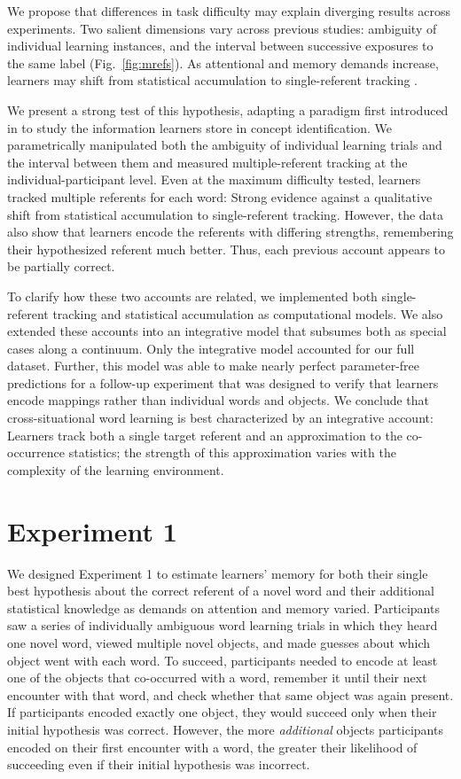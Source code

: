 \documentclass[man,floatsintext]{apa6}
\begin{document}
We propose that differences in task difficulty may explain diverging results across experiments. Two salient dimensions vary across previous studies: ambiguity of individual learning instances, and the interval between successive exposures to the same label (Fig.~\ref{fig:mrefs}). As attentional and memory demands increase, learners may shift from statistical accumulation to single-referent tracking \cite{Smith2011a, Trueswell2013}. 

We present a strong test of this hypothesis, adapting a paradigm first introduced in  to study the information learners store in concept identification. We parametrically manipulated both the ambiguity of individual learning trials and the interval between them and measured multiple-referent tracking at the individual-participant level. Even at the maximum difficulty tested, learners tracked multiple referents for each word: Strong evidence against a qualitative shift from statistical accumulation to single-referent tracking. However, the data also show that learners encode the referents with differing strengths, remembering their hypothesized referent much better. Thus, each previous account appears to be partially correct. 

To clarify how these two accounts are related, we implemented both single-referent tracking and statistical accumulation as computational models. We also extended these accounts into an integrative model that subsumes both as special cases along a continuum. Only the integrative model accounted for our full dataset. Further, this model was able to make nearly perfect parameter-free predictions for a follow-up experiment that was designed to verify that learners encode mappings rather than individual words and objects. We conclude that cross-situational word learning is best characterized by an integrative account: Learners track both a single target referent and an approximation to the co-occurrence statistics; the strength of this approximation varies with the complexity of the learning environment.

\section{Experiment 1}

We designed Experiment 1 to estimate learners' memory for both their single best hypothesis about the correct referent of a novel word and their additional statistical knowledge as demands on attention and memory varied. Participants saw a series of individually ambiguous word learning trials in which they heard one novel word, viewed multiple novel objects, and made guesses about which object went with each word. To succeed, participants needed to encode at least one of the objects that co-occurred with a word, remember it until their next encounter with that word, and check whether that same object was again present. If participants encoded exactly one object, they would succeed only when their initial hypothesis was correct. However, the more \emph{additional} objects participants encoded on their first encounter with a word, the greater their likelihood of succeeding even if their initial hypothesis was incorrect. 
\end{document}
